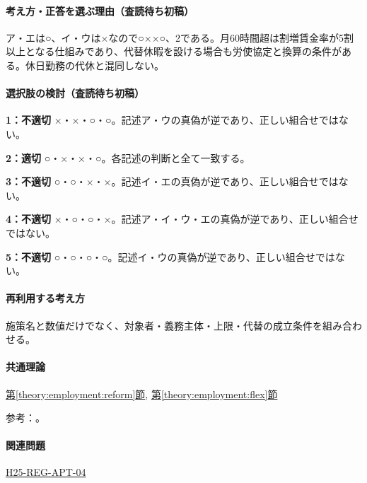 \paragraph{考え方・正答を選ぶ理由（査読待ち初稿）} ア・エは○、イ・ウは×なので○××○、2である。月60時間超は割増賃金率が5割以上となる仕組みであり、代替休暇を設ける場合も労使協定と換算の条件がある。休日勤務の代休と混同しない。

\paragraph{選択肢の検討（査読待ち初稿）}\mbox{}\par

\noindent\textbf{1：不適切} ×・×・○・○。記述ア・ウの真偽が逆であり、正しい組合せではない。\par

\noindent\textbf{2：適切} ○・×・×・○。各記述の判断と全て一致する。\par

\noindent\textbf{3：不適切} ○・○・×・×。記述イ・エの真偽が逆であり、正しい組合せではない。\par

\noindent\textbf{4：不適切} ×・○・○・×。記述ア・イ・ウ・エの真偽が逆であり、正しい組合せではない。\par

\noindent\textbf{5：不適切} ○・○・○・○。記述イ・ウの真偽が逆であり、正しい組合せではない。\par

\paragraph{再利用する考え方} 施策名と数値だけでなく、対象者・義務主体・上限・代替の成立条件を組み合わせる。

\paragraph{共通理論} \hyperref[theory:employment:reform]{第\ref*{theory:employment:reform}節}, \hyperref[theory:employment:flex]{第\ref*{theory:employment:flex}節}

\par 参考：\cite{employment_reform2018,employment_paidleave,employment_alternative2008}。

\paragraph{関連問題} \hyperref[q:h25-reg-apt-04]{H25-REG-APT-04}


